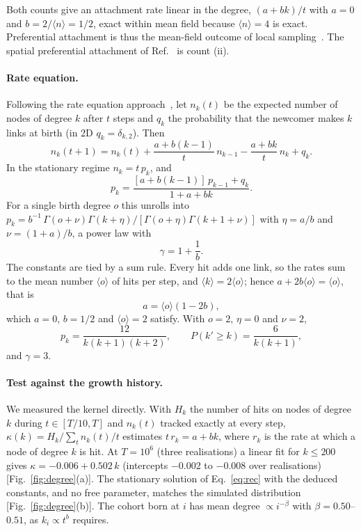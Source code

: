 \documentclass[pre,twocolumn,superscriptaddress,amsmath,amssymb,floatfix]{revtex4-2}
\begin{document}
Both counts give an attachment rate linear in the degree, $(a+bk)/t$ with $a=0$ and
$b=2/\langle n\rangle=1/2$, exact within mean field because $\langle n\rangle=4$ is exact.
Preferential attachment is thus the mean-field outcome of local
sampling~\cite{vazquez2003,vazquezbook}. The spatial
preferential attachment of Ref.~\cite{both2026} is count (ii).

\paragraph*{Rate equation.}
Following the rate equation approach~\cite{krapivsky2000}, let $n_k(t)$ be the
expected number of nodes of degree $k$ after $t$ steps and $q_k$ the probability that
the newcomer makes $k$ links at birth (in 2D $q_k=\delta_{k,2}$). Then
\begin{equation}
  n_k(t+1)=n_k(t)+\frac{a+b(k-1)}{t}\,n_{k-1}-\frac{a+bk}{t}\,n_k+q_k .
  \label{eq:rate}
\end{equation}
In the stationary regime $n_k=t\,p_k$, and
\begin{equation}
  p_k=\frac{[a+b(k-1)]\,p_{k-1}+q_k}{1+a+bk}.
  \label{eq:rec}
\end{equation}
For a single birth degree $o$ this unrolls into
$p_k=b^{-1}\,\Gamma(o+\nu)\Gamma(k+\eta)/[\Gamma(o+\eta)\Gamma(k+1+\nu)]$ with
$\eta=a/b$ and $\nu=(1+a)/b$, a power law with
\begin{equation}
  \gamma=1+\frac1b .
  \label{eq:gammab}
\end{equation}
The constants are tied by a sum rule. Every hit adds one link, so the rates sum to the
mean number $\langle o\rangle$ of hits per step, and $\langle k\rangle=2\langle o\rangle$;
hence $a+2b\langle o\rangle=\langle o\rangle$, that is
\begin{equation}
  a=\langle o\rangle(1-2b),
  \label{eq:sumrule}
\end{equation}
which $a=0$, $b=1/2$ and $\langle o\rangle=2$ satisfy. With $o=2$, $\eta=0$ and $\nu=2$,
\begin{equation}
  p_k=\frac{12}{k(k+1)(k+2)},\qquad P(k'\ge k)=\frac{6}{k(k+1)},
  \label{eq:pk}
\end{equation}
and $\gamma=3$.

\paragraph*{Test against the growth history.}
We measured the kernel directly. With $H_k$ the number of hits on nodes of degree $k$
during $t\in[T/10,T]$ and $n_k(t)$ tracked exactly at every step,
$\kappa(k)=H_k/\sum_tn_k(t)/t$ estimates $t\,r_k=a+bk$, where $r_k$ is the rate at
which a node of degree $k$ is hit. At $T=10^6$ (three
realisations) a linear fit for $k\le200$ gives
$\kappa=-0.006+0.502\,k$ (intercepts $-0.002$ to $-0.008$ over realisations) [Fig.~\ref{fig:degree}(a)].
The stationary solution of Eq.~\eqref{eq:rec} with the deduced constants, and no free
parameter, matches the simulated distribution [Fig.~\ref{fig:degree}(b)]. The cohort born at $i$ has mean
degree $\propto i^{-\beta}$ with $\beta=0.50$--$0.51$, as $k_i\propto t^b$ requires.
\end{document}
